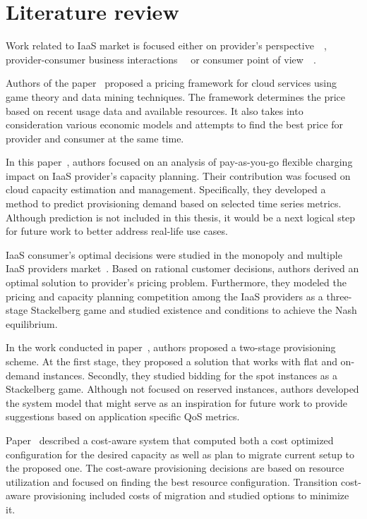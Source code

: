 \documentclass[]{final_report}
\begin{document}
\section{Literature review}

Work related to IaaS market is focused either on provider's perspective~\cite{6274129}~\cite{6253563}, provider-consumer business interactions~\cite{6676685}~\cite{6963393} or consumer point of view~\cite{5961733}~\cite{6295066}. 

Authors of the paper~\cite{6253563} proposed a pricing framework for cloud services using game theory and data mining techniques. The framework determines the price based on recent usage data and available resources. It also takes into consideration various economic models and attempts to find the best price for provider and consumer at the same time.

In this paper~\cite{6274129}, authors focused on an analysis of pay-as-you-go flexible charging impact on IaaS provider's capacity planning. Their contribution was focused on cloud capacity estimation and management. Specifically, they developed a method to predict provisioning demand based on selected time series metrics. 
Although prediction is not included in this thesis, it would be a next logical step for future work to better address real-life use cases. 

IaaS consumer's optimal decisions were studied in the monopoly and multiple IaaS providers market~\cite{6963393}. Based on rational customer decisions, authors derived an optimal solution to provider's pricing problem. Furthermore, they modeled the pricing and capacity planning competition among the IaaS providers as a three-stage Stackelberg game and studied existence and conditions to achieve the Nash equilibrium. 

In the work conducted in paper~\cite{6676685}, authors proposed a two-stage provisioning scheme. At the first stage, they proposed a solution that works with flat and on-demand instances. Secondly, they studied bidding for the spot instances as a Stackelberg game. Although not focused on reserved instances, authors developed the system model that might serve as an inspiration for future work to provide suggestions based on application specific QoS metrics. 

Paper~\cite{5961733} described a cost-aware system that computed both a cost optimized configuration for the desired capacity as well as plan to migrate current setup to the proposed one. The cost-aware provisioning decisions are based on resource utilization and focused on finding the best resource configuration. Transition cost-aware provisioning included costs of migration and studied options to minimize it. 
\end{document}
